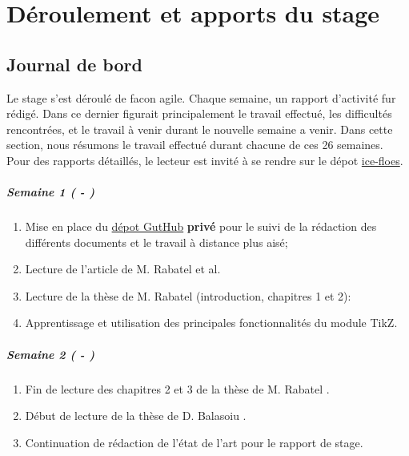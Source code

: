 
\chapter{Déroulement et apports du stage} %

\label{Chapter5} %







\section{Journal de bord}

Le stage s'est déroulé de facon agile. Chaque semaine, un rapport d'activité fur rédigé. Dans ce dernier figurait principalement le travail effectué, les difficultés rencontrées, et le travail à venir durant le nouvelle semaine a venir. Dans cette section, nous résumons le travail effectué durant chacune de ces 26 semaines. Pour des rapports détaillés, le lecteur est invité à se rendre sur le dépot \href{https://github.com/desmond-rn/ice-floes/tree/master/reports/weeks}{ice-floes}.

\paragraph{Semaine 1 ( - )} 
\begin{enumerate}
    \item Mise en place du \href{https://github.com/desmond-rn/ice-floes}{dépot GutHub} \textbf{privé} pour le suivi de la rédaction des différents documents et le travail à distance plus aisé; 
    \item Lecture de l'article de M. Rabatel et al. \parencite{rabatel2015dynamics}
    \item Lecture de la thèse de M. Rabatel \parencite{rabatel2015thesis} (introduction, chapitres 1 et 2):
    \item Apprentissage et utilisation des principales fonctionnalités du module TikZ.   
\end{enumerate}
  
\paragraph{Semaine 2 ( - )} 
\begin{enumerate}
    \item Fin de lecture des chapitres 2 et 3 de la thèse de M. Rabatel \parencite{rabatel2015thesis}.
    \item Début de lecture de la thèse de D. Balasoiu \parencite{balasoiu2020thesis}.
    \item Continuation de rédaction de l'état de l'art pour le rapport de stage.
  \end{enumerate}
  

